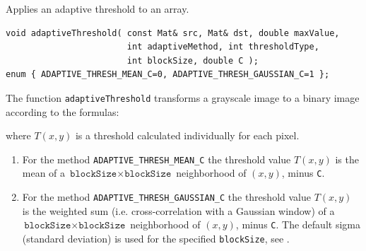 \label{adaptiveThreshold}
Applies an adaptive threshold to an array.

\begin{lstlisting}
void adaptiveThreshold( const Mat& src, Mat& dst, double maxValue,
                        int adaptiveMethod, int thresholdType,
                        int blockSize, double C );
enum { ADAPTIVE_THRESH_MEAN_C=0, ADAPTIVE_THRESH_GAUSSIAN_C=1 };
\end{lstlisting}
\begin{description}
\end{description}

The function \texttt{adaptiveThreshold} transforms a grayscale image to a binary image according to the formulas:

\begin{description}
\end{description}

where $T(x,y)$ is a threshold calculated individually for each pixel.

\begin{enumerate}
    \item
For the method \texttt{ADAPTIVE\_THRESH\_MEAN\_C} the threshold value $T(x,y)$ is the mean of a $\texttt{blockSize} \times \texttt{blockSize}$ neighborhood of $(x, y)$, minus \texttt{C}.
    \item
For the method \texttt{ADAPTIVE\_THRESH\_GAUSSIAN\_C} the threshold value $T(x, y)$ is the weighted sum (i.e. cross-correlation with a Gaussian window) of a $\texttt{blockSize} \times \texttt{blockSize}$ neighborhood of $(x, y)$, minus \texttt{C}. The default sigma (standard deviation) is used for the specified \texttt{blockSize}, see .
\end{enumerate}

